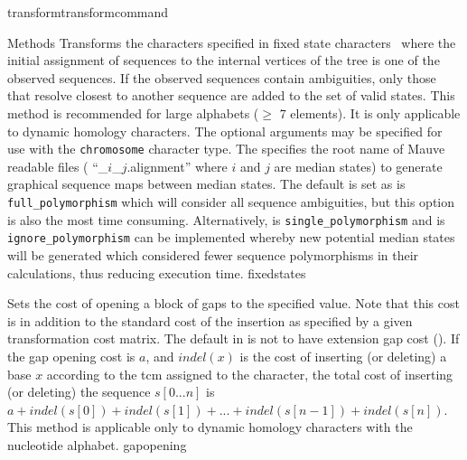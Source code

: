 \begin{command}{transform}{transformcommand}
\begin{arguments}
\begin{argumentgroup}{Methods}
          {Transforms the characters specified in fixed state characters~\cite{wheeler1999a}
          where the initial assignment of sequences to the internal vertices of
          the tree is one of the observed sequences. If the observed sequences
          contain ambiguities, only those that resolve closest to another
          sequence are added to the set of valid states. This method is
          recommended for large alphabets ($\ge$ 7 elements). It is only
          applicable to dynamic homology characters.  The optional arguments may be specified
          for use with the \texttt{chromosome} character type.  The \poystring specifies the
          root name of Mauve \cite{darlingetal2004} readable files ( ``\poystring\_$i$\_$j$.alignment'' 
          where $i$ and $j$ are median states) to generate graphical sequence maps between median states. The default
           is set as \poylident is \texttt{full\_polymorphism} which will consider all sequence ambiguities, but this option is also the most 
           time consuming. Alternatively, \poylident is \texttt{single\_polymorphism} and \poylident is \texttt{ignore\_polymorphism} can be 
           implemented whereby new potential median states will be generated which considered fewer sequence polymorphisms in their 
           calculations, thus reducing execution time.}
          {fixedstates}
          
            {Sets the cost of opening a block of gaps to the specified value. Note that
            this cost is in addition to the standard cost of the insertion as
            specified by a given transformation cost matrix.
            The default in \poy is not to have extension
            gap cost (). If the gap
            opening cost is
            $a$, and $indel(x)$ is the cost of inserting (or deleting) a
            base $x$ according to the tcm assigned to the character, the total
            cost of inserting (or deleting) the sequence $s[0...n]$ is $a +
            indel(s[0]) + indel(s[1]) + ... + indel(s[n - 1]) + indel(s[n]).$
            This method is applicable only to dynamic homology characters with
            the nucleotide alphabet.} 
            {gapopening}
            

\end{argumentgroup}
\end{arguments}
\end{command}
